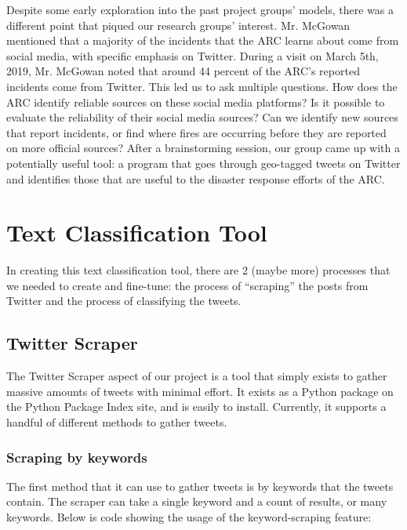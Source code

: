\documentclass[titlepage, 12pt]{article}
\begin{document}
\hspace{0.5 cm} Despite some early exploration into the past project groups' models, there was a different point that piqued our research groups' interest. Mr. McGowan mentioned that a majority of the incidents that the ARC learns about come from social media, with specific emphasis on Twitter. During a visit on March 5th, 2019, Mr. McGowan noted that around 44 percent of the ARC's reported incidents come from Twitter. This led us to ask multiple questions. How does the ARC identify reliable sources on these social media platforms? Is it possible to evaluate the reliability of their social media sources? Can we identify new sources that report incidents, or find where fires are occurring before they are reported on more official sources? After a brainstorming session, our group came up with a potentially useful tool: a program that goes through geo-tagged tweets on Twitter and identifies those that are useful to the disaster response efforts of the ARC.

\section{Text Classification Tool}
\hspace{0.5 cm} In creating this text classification tool, there are 2 (maybe more) processes that we needed to create and fine-tune: the process of ``scraping'' the posts from Twitter and the process of classifying the tweets.
\subsection{Twitter Scraper}
\hspace{0.5 cm} The Twitter Scraper aspect of our project is a tool that simply exists to gather massive amounts of tweets with minimal effort. It exists as a Python package on the Python Package Index site, and is easily to install. Currently, it supports a handful of different methods to gather tweets.

\subsubsection{Scraping by keywords}

The first method that it can use to gather tweets is by keywords that the tweets contain. The scraper can take a single keyword and a count of results, or many keywords. Below is code showing the usage of the keyword-scraping feature:
\end{document}
